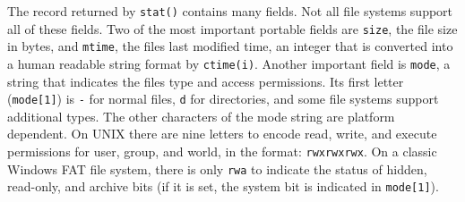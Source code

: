 
The record returned by \texttt{stat()} contains many fields. Not all
file systems support all of these fields. Two of the most important
portable fields are \texttt{size}, the file size in
bytes, and \texttt{mtime}, the file{\textquotesingle}s last
modified time, an integer that is converted
into a human readable string format by \texttt{ctime(i)}. Another
important field is \texttt{mode}, a string that indicates the
file{\textquotesingle}s type and access
permissions. Its first letter (\texttt{mode[1]}) is
\texttt{{\textquotedbl}-{\textquotedbl}} for normal files,
\texttt{{\textquotedbl}d{\textquotedbl}} for directories, and some file
systems support additional types. The other characters of the mode
string are platform dependent. On UNIX there are nine letters to encode
read, write, and execute permissions for user, group, and world, in the
format: \texttt{{\textquotedbl}rwxrwxrwx{\textquotedbl}}. On a classic
Windows FAT file system, there is only
\texttt{{\textquotedbl}rwa{\textquotedbl}} to indicate the status of
hidden, read-only, and archive bits (if it is set, the system bit is
indicated in \texttt{mode[1]}).

